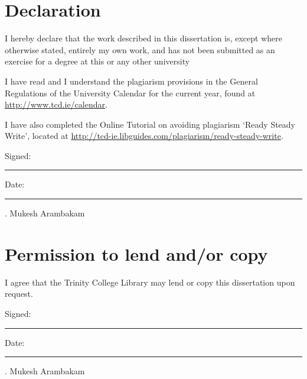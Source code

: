\documentclass[a4paper,oneside,12pt]{book}
\title{\thesistitle}
\author{\authorname}
\begin{document}



\setlength\paperheight{297mm}
\setlength\paperwidth{210mm}

\setlength{\textheight}{235mm} %
\setlength{\oddsidemargin}{10mm}  %
\setlength{\evensidemargin}{10mm} %
\setlength{\textwidth}{155mm}



\section*{\Huge{Declaration}}
\vspace{1cm}
I hereby declare that the work described in this dissertation is, except where otherwise stated, entirely my own work, and has not been submitted as an exercise for a degree at this or any other university

\vspace{1cm}
I have read and I understand the plagiarism provisions in the General Regulations of the University Calendar for the current year, found at \url{http://www.tcd.ie/calendar}.
\vspace{1cm}

I have also completed the Online Tutorial on avoiding plagiarism `Ready Steady Write', located at
\url{http://tcd-ie.libguides.com/plagiarism/ready-steady-write}.
\vspace{3cm}

Signed:~\rule{5cm}{0.3pt}\hfill Date:~\rule{5cm}{0.3pt}
\newline
.\hspace{1.1cm} Mukesh Arambakam
\newpage

\section*{\Huge{Permission to lend and/or copy}}
\vspace{1cm}
I agree that the Trinity College Library may lend or copy this dissertation upon request.

\vspace{3cm}

Signed:~\rule{5cm}{0.3pt}\hfill Date:~\rule{5cm}{0.3pt}
\newline
.\hspace{1.1cm} Mukesh Arambakam
\end{document}
